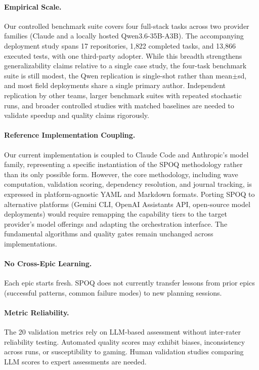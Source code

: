 \paragraph{Empirical Scale.}
Our controlled benchmark suite covers four full-stack tasks across two
provider families (Claude and a locally hosted Qwen3.6-35B-A3B). The
accompanying deployment study spans 17 repositories, 1{,}822 completed
tasks, and 13{,}866 executed tests, with one third-party adopter. While
this breadth strengthens generalizability claims relative to a single
case study, the four-task benchmark suite is still modest, the Qwen
replication is single-shot rather than mean$\pm$sd, and most field
deployments share a single primary author. Independent replication by
other teams, larger benchmark suites with repeated stochastic runs,
and broader controlled studies with matched baselines are needed to
validate speedup and quality claims rigorously.

\paragraph{Reference Implementation Coupling.}
Our current implementation is coupled to Claude Code and Anthropic's
model family, representing a specific instantiation of the SPOQ methodology
rather than its only possible form. However, the core methodology, including wave
computation, validation scoring, dependency resolution, and journal
tracking, is expressed in platform-agnostic YAML and Markdown formats.
Porting SPOQ to alternative platforms (Gemini CLI, OpenAI Assistants API,
open-source model deployments) would require remapping the capability
tiers to the target provider's model offerings and adapting the
orchestration interface. The fundamental algorithms and quality gates
remain unchanged across implementations.

\paragraph{No Cross-Epic Learning.}
Each epic starts fresh. SPOQ does not currently transfer lessons
from prior epics (successful patterns, common failure modes) to
new planning sessions.

\paragraph{Metric Reliability.}
The 20 validation metrics rely on LLM-based assessment without
inter-rater reliability testing. Automated quality scores may
exhibit biases, inconsistency across runs, or susceptibility
to gaming. Human validation studies comparing LLM scores to
expert assessments are needed.


